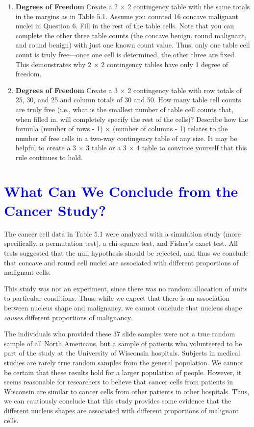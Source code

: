 \documentclass[
]{report}
\begin{document}
\begin{enumerate}
\def\labelenumi{\arabic{enumi}.}
\setcounter{enumi}{19}
\item
  \textbf{Degrees of Freedom} Create a 2 × 2 contingency table with the same totals in the margins as in Table 5.1. Assume you counted 16 concave malignant nuclei in Question 6. Fill in the rest of the table cells. Note that you can complete the other three table counts (the concave benign, round malignant, and round benign) with just one known count value. Thus, only one table cell count is truly free---once one cell is determined, the other three are fixed. This demonstrates why 2 × 2 contingency tables have only 1 degree of freedom.
\item
  \textbf{Degrees of Freedom} Create a 3 × 2 contingency table with row totals of 25, 30, and 25 and column totals of 30 and 50. How many table cell counts are truly free (i.e., what is the smallest number of table cell counts that, when filled in, will completely specify the rest of the cells)? Describe how the formula (number of rows - 1) × (number of columns - 1) relates to the number of free cells in a two-way contingency table of any size. It may be helpful to create a 3 × 3 table or a 3 × 4 table to convince yourself that this rule continues to hold.
\end{enumerate}

\hypertarget{section-54}{%
\section{\texorpdfstring{\textcolor{blue}{What Can We Conclude from the Cancer Study?}}{}}\label{section-54}}

The cancer cell data in Table 5.1 were analyzed with a simulation study (more specifically, a permutation test), a chi-square test, and Fisher's exact test. All tests suggested that the null hypothesis should be rejected, and thus we conclude that concave and round cell nuclei are associated with different proportions of malignant cells.

This study was not an experiment, since there was no random allocation of units to particular conditions. Thus, while we expect that there is an association between nucleus shape and malignancy, we cannot conclude that nucleus shape \emph{causes} different proportions of malignancy.

The individuals who provided these 37 slide samples were not a true random sample of all North Americans, but a sample of patients who volunteered to be part of the study at the University of Wisconsin hospitals. Subjects in medical studies are rarely true random samples from the general population. We cannot be certain that these results hold for a larger population of people. However, it seems reasonable for researchers to believe that cancer cells from patients in Wisconsin are similar to cancer cells from other patients in other hospitals. Thus, we can cautiously conclude that this study provides some evidence that the different nucleus shapes are associated with different proportions of malignant cells.
\end{document}
